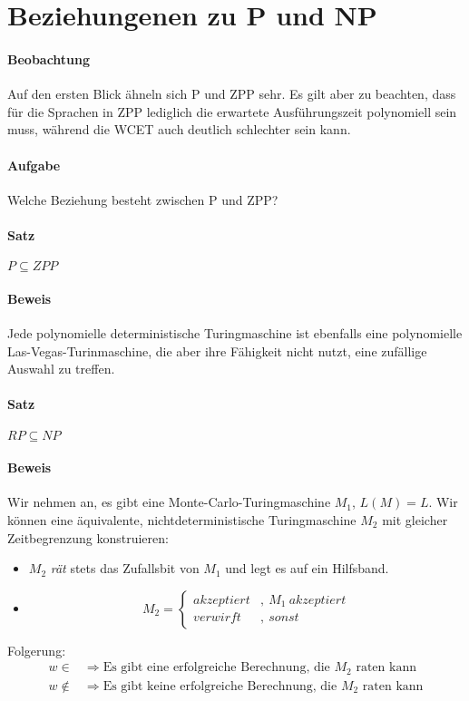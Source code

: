 \section{Beziehungenen zu P und NP}
\paragraph{Beobachtung}
Auf den ersten Blick ähneln sich P und ZPP sehr.
Es gilt aber zu beachten, dass für die Sprachen in ZPP lediglich die erwartete Ausführungszeit polynomiell sein muss, während die WCET auch deutlich schlechter sein kann.

\paragraph{Aufgabe}
Welche Beziehung besteht zwischen P und ZPP?

\paragraph{Satz}
$P \subseteq ZPP$

\paragraph{Beweis}
Jede polynomielle deterministische Turingmaschine ist ebenfalls eine polynomielle Las-Vegas-Turinmaschine, die aber ihre Fähigkeit nicht nutzt, eine zufällige Auswahl zu treffen.

\paragraph{Satz}
$RP \subseteq NP$

\paragraph{Beweis}
Wir nehmen an, es gibt eine Monte-Carlo-Turingmaschine $M_1$, $L(M) = L$.
Wir können eine äquivalente, nichtdeterministische Turingmaschine $M_2$ mit gleicher Zeitbegrenzung konstruieren:
\begin{itemize}
	\item $M_2$ \emph{rät} stets das Zufallsbit von $M_1$ und legt es auf ein Hilfsband.
	\item \begin{equation*}
		M_2 =
		\begin{cases}
			akzeptiert &,\ M_1\ akzeptiert\\
			verwirft &,\ sonst
		\end{cases}
	\end{equation*}
\end{itemize}
Folgerung:
\begin{align*}
	w \in &\Rightarrow \text{Es gibt eine erfolgreiche Berechnung, die }M_2\text{ raten kann}\\
	w \notin &\Rightarrow \text{Es gibt keine erfolgreiche Berechnung, die }M_2\text{ raten kann}
\end{align*}